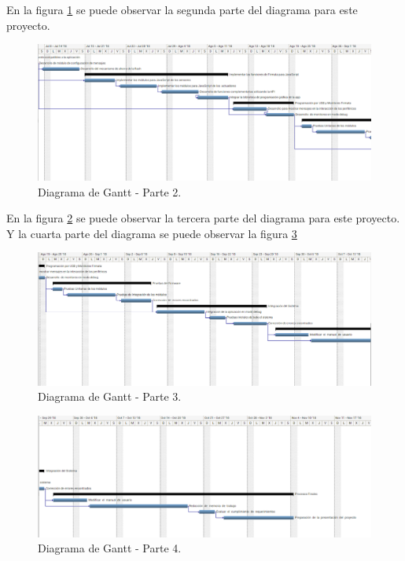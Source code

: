 En la figura \ref{fig:diagramaGanttSegundaParte} se puede observar la segunda parte del diagrama para este proyecto. 

\begin{figure}[h]
	\centering
	\includegraphics[scale=.30]{./Figures/diagramaGanttSegundaParte.png}
	\caption{Diagrama de Gantt - Parte 2.}
	\label{fig:diagramaGanttSegundaParte}
\end{figure}

En la figura \ref{fig:diagramaGanttTerceraParte} se puede observar la tercera parte del diagrama para este proyecto. Y la cuarta parte del diagrama se puede observar la figura \ref{fig:diagramaGanttCuartaParte} 

\begin{figure}[h]
	\centering
	\includegraphics[scale=.30]{./Figures/diagramaGanttTerceraParte.png}
	\caption{Diagrama de Gantt - Parte 3.}
	\label{fig:diagramaGanttTerceraParte}
\end{figure}

\begin{figure}[h]
	\centering
	\includegraphics[scale=.30]{./Figures/diagramaGanttCuartaParte.png}
	\caption{Diagrama de Gantt - Parte 4.}
	\label{fig:diagramaGanttCuartaParte}
\end{figure}
